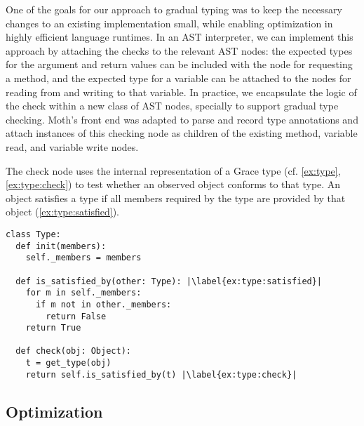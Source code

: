 
One of the goals for our approach to gradual typing was to keep
the necessary changes to an existing implementation small,
while enabling optimization in highly efficient language runtimes.
%
In an AST interpreter, we can implement this approach by attaching the
checks to the relevant AST nodes: the expected types for the argument
and return values can be included with the node for requesting a
method, and the expected type for a variable can be attached to the
nodes for reading from and writing to that variable.  In practice, we
encapsulate the logic of the check within a new class of AST
nodes, specially to support gradual type checking.  Moth's front end was adapted to parse and record type
annotations and attach instances of this checking node as children of the
existing method, variable read, and variable write nodes.



%

The check node uses the internal representation of a Grace type
(cf. \cref{ex:type}, \cref{ex:type:check}) to test whether an observed
object conforms to that type. 
An object satisfies a type if all members required by the type are provided
by that object (\cref{ex:type:satisfied}).


\begin{lstlisting}[label={ex:type},escapechar=|,caption={Sketch of a \code{Type} in our system and its \code{check()} semantics.},float,floatplacement=htb,columns=flexible,float,floatplacement=H]
class Type:
  def init(members):
    self._members = members

  def is_satisfied_by(other: Type): |\label{ex:type:satisfied}|
    for m in self._members:
      if m not in other._members:
        return False
    return True

  def check(obj: Object):
    t = get_type(obj)
    return self.is_satisfied_by(t) |\label{ex:type:check}|
\end{lstlisting}


\subsection{Optimization}
\label{ssec:optimization}

